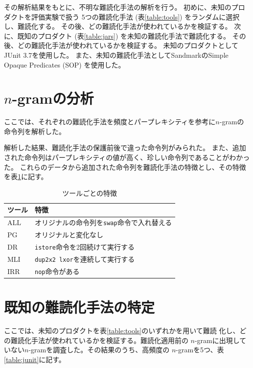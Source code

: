 \documentclass[12pt,twoside]{jreport}
\begin{document}
その解析結果をもとに、不明な難読化手法の解析を行う。
初めに、未知のプロダクトを評価実験で扱う
5つの難読化手法 (表\ref{table:tools}) をランダムに選択し、難読化する。
その後、どの難読化手法が使われているかを検証する。
次に、既知のプロダクト (表\ref{table:jars}) を未知の難読化手法で難読化する。
その後、どの難読化手法が使われているかを検証する。
未知のプロダクトとしてJUnit 3.7を使用した。
また、未知の難読化手法としてSandmarkのSimple Opaque Predicates (SOP) を使用した。

\section{$n$-gramの分析}

ここでは、それぞれの難読化手法を頻度とパープレキシティを参考に$n$-gramの命令列を解析した。

解析した結果、難読化手法の保護前後で違った命令列がみられた。
また、追加された命令列はパープレキシティの値が高く、珍しい命令列であることがわかった。
これらのデータから追加された命令列を難読化手法の特徴とし、その特徴を表\ref{table:features}に記す。

\begin{table}[t]
  \centering
  \footnotesize{
    \caption{ツールごとの特徴}\label{table:features}
  \begin{tabular}{l|l}
    ツール              & 特徴　\\ \hline
    ALL & オリジナルの命令列を\texttt{swap}命令で入れ替える \\
    PG  & オリジナルと変化なし \\
    DR  & \texttt{istore}命令を2回続けて実行する \\
    MLI & \texttt{dup2x2 lxor}を連続して実行する \\
    IRR & \texttt{nop}命令がある \\
  \end{tabular}}
\end{table}

\section{既知の難読化手法の特定}

ここでは、未知のプロダクトを表\ref{table:tools}のいずれかを用いて難読
化し、どの難読化手法が使われているかを検証する。難読化適用前の
$n$-gramに出現していない$n$-gramを調査した。その結果のうち、高頻度の
$n$-gramを5つ、表\ref{table:junit}に記す。
\end{document}
